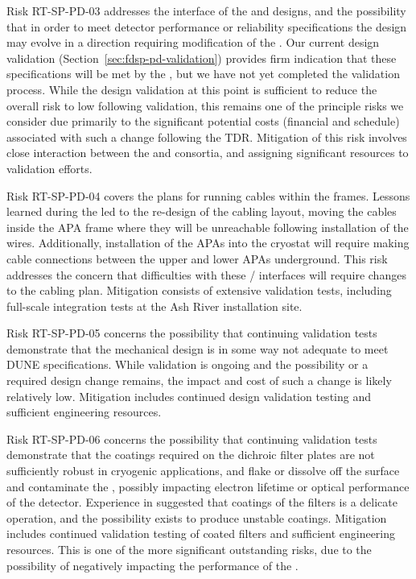 Risk RT-SP-PD-03 addresses the interface of the  and  designs, and the possibility that in order to meet detector performance or reliability specifications the  design may evolve in a direction requiring modification of the .  Our current design validation (Section~\ref{sec:fdsp-pd-validation}) provides firm indication that these specifications will be met by the , but we have not yet completed the validation process.  While the design validation at this point is sufficient to reduce the overall risk to low following validation, this remains one of the principle risks we consider due primarily to the significant potential costs (financial and schedule) associated with such a change following the TDR.  Mitigation of this risk involves close interaction between the  and  consortia, and assigning significant resources to  validation efforts.

Risk RT-SP-PD-04 covers the plans for running  cables within the  frames.  Lessons learned during the  led to the re-design of the  cabling layout, moving the cables inside the APA frame where they will be unreachable following installation of the  wires.  Additionally, installation of the APAs into the cryostat will require making  cable connections between the upper and lower APAs underground.  This risk addresses the concern that difficulties with these / interfaces will require changes to the cabling plan.  Mitigation consists of extensive validation tests, including full-scale integration tests at the Ash River installation site.

Risk RT-SP-PD-05 concerns the possibility that continuing validation tests demonstrate that the  mechanical design is in some way not adequate to meet DUNE specifications.  While validation is ongoing and the possibility or a required design change remains, the impact and cost of such a change is likely relatively low.  Mitigation includes continued design validation testing and sufficient engineering resources.

Risk RT-SP-PD-06 concerns the possibility that continuing validation tests demonstrate that the coatings required on the dichroic filter plates are not sufficiently robust in cryogenic applications, and flake or dissolve off the surface and contaminate the , possibly impacting electron lifetime or optical performance of the detector.  Experience in  suggested that coatings of the filters is a delicate operation, and the possibility exists to produce unstable coatings.  Mitigation includes continued validation testing of coated filters and sufficient engineering resources.  This is one of the more significant outstanding risks, due to the possibility of negatively impacting the performance of the .

